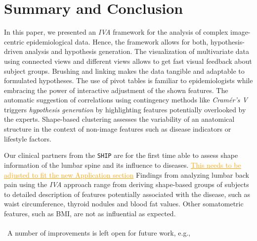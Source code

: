 \documentclass[journal]{style/vgtc} 			          %
\newcommand{\com}[1]{\textcolor{orange}{\uline{#1}}}
\begin{document}
% 

\section{Summary and Conclusion}
In this paper, we presented an \emph{IVA} framework for the analysis of complex image-centric epidemiological data.
%
Hence, the framework allows for both, hypothesis-driven analysis and hypothesis generation.
%
The visualization of multivariate data using connected views and different views allows to get fast visual feedback about subject groups.
%
Brushing and linking makes the data tangible and adaptable to formulated hypotheses.
%
The use of pivot tables is familiar to epidemiologists while embracing the power of interactive adjustment of the shown features.
%
The automatic suggestion of correlations using contingency methods like \emph{Cram\'{e}r's V} triggers \emph{hypothesis generation} by highlighting features potentially overlooked by the experts.
%
Shape-based clustering assesses the variability of an anatomical structure in the context of non-image features such as disease indicators or lifestyle factors.

Our clinical partners from the \texttt{SHIP} are for the first time able to assess shape information of the lumbar spine and its influence to diseases.
%
\com{This needs to be adjusted to fit the new Application section}
Findings from analyzing lumbar back pain using the \emph{IVA} approach range from deriving shape-based groups of subjects to detailed description of features potentially associated with the disease, such as waist circumference, thyroid nodules and blood fat values.
%
Other somatometric features, such as BMI, are not as influential as expected.
%
\\\\\
A number of improvements is left open for future work, e.g.,
\end{document}
